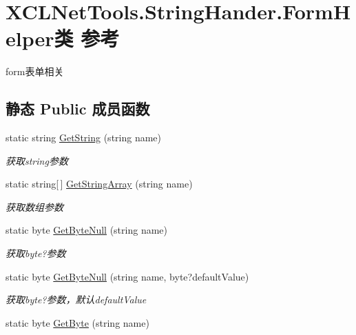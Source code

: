 \hypertarget{class_x_c_l_net_tools_1_1_string_hander_1_1_form_helper}{\section{X\-C\-L\-Net\-Tools.\-String\-Hander.\-Form\-Helper类 参考}
\label{class_x_c_l_net_tools_1_1_string_hander_1_1_form_helper}
}


form表单相关  


\subsection*{静态 Public 成员函数}
\begin{DoxyCompactItemize}
\item 
static string \hyperlink{class_x_c_l_net_tools_1_1_string_hander_1_1_form_helper_a8c34c5210ad29ea122ee8320b4f14f9f}{Get\-String} (string name)
\begin{DoxyCompactList}\small\item\em 获取string参数 \end{DoxyCompactList}\item 
static string\mbox{[}$\,$\mbox{]} \hyperlink{class_x_c_l_net_tools_1_1_string_hander_1_1_form_helper_a9b7680e6e7975889a62f273eaacdf37c}{Get\-String\-Array} (string name)
\begin{DoxyCompactList}\small\item\em 获取数组参数 \end{DoxyCompactList}\item 
static byte \hyperlink{class_x_c_l_net_tools_1_1_string_hander_1_1_form_helper_a9d43824d313342bfc66623f548ad6ad6}{Get\-Byte\-Null} (string name)
\begin{DoxyCompactList}\small\item\em 获取byte?参数 \end{DoxyCompactList}\item 
static byte \hyperlink{class_x_c_l_net_tools_1_1_string_hander_1_1_form_helper_a4b2dafb903bedae1af30683209520136}{Get\-Byte\-Null} (string name, byte?default\-Value)
\begin{DoxyCompactList}\small\item\em 获取byte?参数，默认default\-Value \end{DoxyCompactList}\item 
static byte \hyperlink{class_x_c_l_net_tools_1_1_string_hander_1_1_form_helper_aac299eb0719beba6c618deeed497fd76}{Get\-Byte} (string name)

\end{DoxyCompactItemize}
